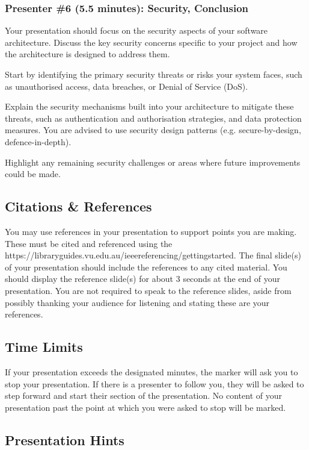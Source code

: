 \documentclass{csse4400}
\begin{document}
\subsubsection{Presenter \#6 (5.5 minutes): Security, Conclusion}

Your presentation should focus on the security aspects of your software architecture.
Discuss the key security concerns specific to your project and how the architecture is designed to address them.

Start by identifying the primary security threats or risks your system faces,
such as unauthorised access, data breaches, or Denial of Service (DoS).

Explain the security mechanisms built into your architecture to mitigate these threats,
such as authentication and authorisation strategies, and data protection measures.
You are advised to use security design patterns (e.g. secure-by-design, defence-in-depth).

Highlight any remaining security challenges or areas where future improvements could be made.

\subsection{Citations \& References}
You may use references in your presentation to support points you are making.
These must be cited and referenced using the 
{https://libraryguides.vu.edu.au/ieeereferencing/gettingstarted}.
The final slide(s) of your presentation should include the references to any cited material.
You should display the reference slide(s) for about 3 seconds at the end of your presentation.
You are not required to speak to the reference slides,
aside from possibly thanking your audience for listening and stating these are your references.

\subsection{Time Limits}

If your presentation exceeds the designated minutes, the marker will ask you to stop your presentation.
If there is a presenter to follow you, they will be asked to step forward and start their section of the presentation.
No content of your presentation past the point at which you were asked to stop will be marked.

\subsection{Presentation Hints}
\end{document}
